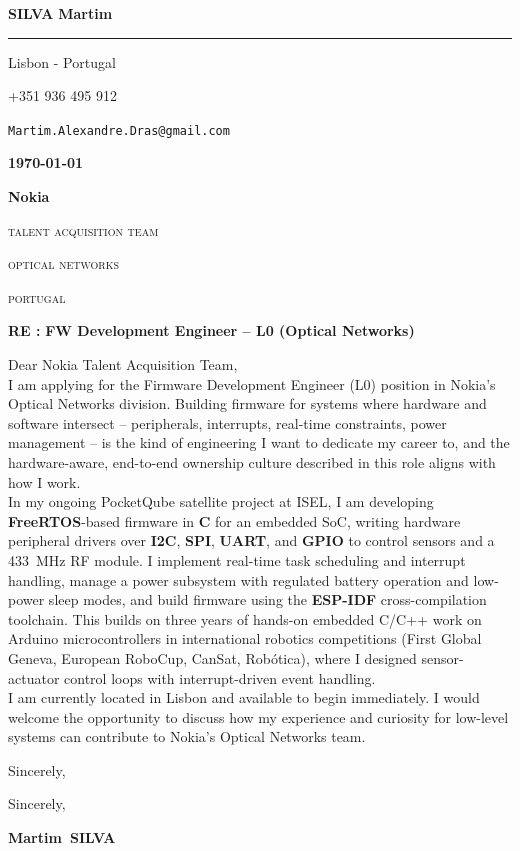 \documentclass[12pt]{article}
\newcommand{\firstname}{Martim}
\newcommand{\lastname}{Silva}
\newcommand{\mainColor}{nokiaBlue}
\newlength{\spacebox}
\newcommand{\shspace}{\hspace*{0.8em}}
\newcommand{\xvspace}{\vspace*{0.1em}}
\newcommand{\svspace}{\vspace*{0.5em}}
\newcommand{\mvspace}{\vspace*{1.5em}}
\newcommand{\hvspace}{\vspace*{2.5em}}
\newcommand{\negmvspace}{\vspace*{-1em}}
\newcommand{\userInfo}[4]{
    \begin{flushleft}
        \color{\mainColor}
        \Huge
        \textbf{\MakeUppercase{\lastname}}
        \color{black}
        \textbf{\firstname}
        \color{\mainColor}
        \noindent\rule{19.1cm}{0.8pt}
        \color{grayShy}
        \small
        \par
        \parbox{7\spacebox} {
            \faMap \shspace #1 - #2 \par \svspace
            \faPhone \shspace #3 \par \svspace
            \faEnvelopeOpen \shspace \texttt{#4} \par \svspace
        }
        \color{\mainColor}
        \mvspace
    \end{flushleft}
    \negmvspace
}
\newcommand{\companyInfo}[4]{
    \begin{flushright}
        \parbox{4\spacebox}{
            \raggedleft
            \small
            \textbf{\today}\par
            \xvspace
            \textbf{#1}\par
            \mvspace
            \color{grayShy} \textsc{\MakeLowercase{#2}}\par
            \xvspace
            \textsc{\MakeLowercase{#3}}\par
            \xvspace
            \textsc{\MakeLowercase{#4}}\par
            \color{black}
        }
    \end{flushright}
    \hvspace
}
\newcommand{\object}[1]{
    \small
    \color{\mainColor} \textbf{RE :} \color{black} \textbf{#1} \par
}
\newcommand{\content}[2]{
    \mvspace
    \begin{flushleft}
        \parbox{10.3\spacebox}{
          #1\par
          \svspace
          #2
        }\par
    \end{flushleft}
}
\newcommand{\signature}{
    \svspace
    \parbox{3\spacebox}{
      Sincerely,\par
      \svspace \hspace{-0.3em}
      \textbf{\color{\mainColor} \firstname\ \MakeUppercase{\lastname}}\par
      \svspace \svspace
      \Huge \faPenNib\par
    }\par
}
\begin{document}
\selectfont
\userInfo{Lisbon}{Portugal}{+351 936 495 912}{Martim.Alexandre.Dras@gmail.com}
\companyInfo{Nokia}{Talent Acquisition Team}{Optical Networks}{Portugal}
\object{FW Development Engineer -- L0 (Optical Networks)}
\content{
  Dear Nokia Talent Acquisition Team, \\

  I am applying for the Firmware Development Engineer (L0) position in Nokia's Optical
  Networks division. Building firmware for systems where hardware and software
  intersect -- peripherals, interrupts, real-time constraints, power management -- is
  the kind of engineering I want to dedicate my career to, and the hardware-aware,
  end-to-end ownership culture described in this role aligns with how I work. \\

  In my ongoing PocketQube satellite project at ISEL, I am developing
  \textbf{FreeRTOS}-based firmware in \textbf{C} for an embedded SoC, writing
  hardware peripheral drivers over \textbf{I2C}, \textbf{SPI}, \textbf{UART}, and
  \textbf{GPIO} to control sensors and a 433~MHz RF module. I implement real-time
  task scheduling and interrupt handling, manage a power subsystem with regulated
  battery operation and low-power sleep modes, and build firmware using the
  \textbf{ESP-IDF} cross-compilation toolchain. This builds on three years of
  hands-on embedded C/C++ work on Arduino microcontrollers in international robotics
  competitions (First Global Geneva, European RoboCup, CanSat, Robótica), where I
  designed sensor-actuator control loops with interrupt-driven event handling. \\

  I am currently located in Lisbon and available to begin immediately. I would
  welcome the opportunity to discuss how my experience and curiosity for low-level
  systems can contribute to Nokia's Optical Networks team. \\
}{Sincerely,}
\signature
\end{document}
